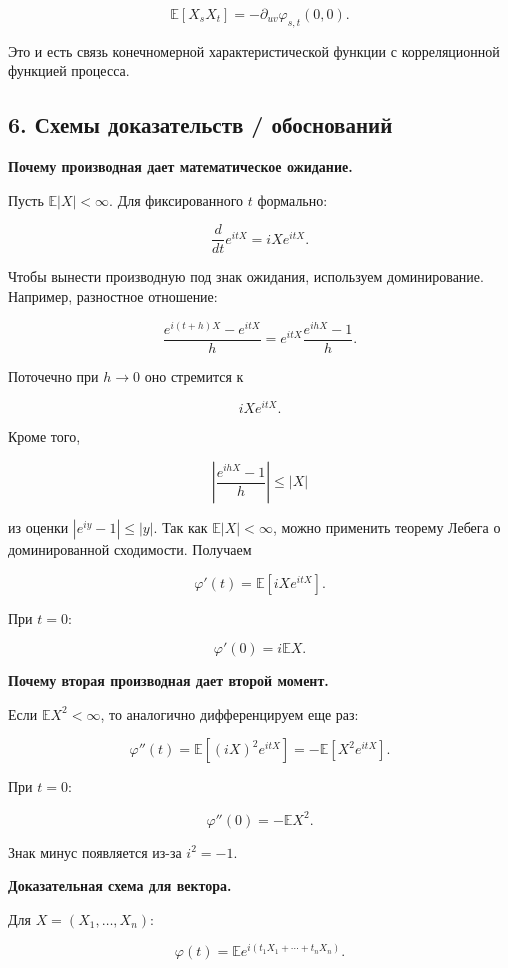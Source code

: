 \documentclass[
  11pt,
  a4paper,
]{article}
\begin{document}
\[
\mathbb E[X_sX_t]
=
-\partial_{uv}\varphi_{s,t}(0,0).
\]

Это и есть связь конечномерной характеристической функции с
корреляционной функцией процесса.

\subsection{6. Схемы доказательств /
обоснований}\label{ux441ux445ux435ux43cux44b-ux434ux43eux43aux430ux437ux430ux442ux435ux43bux44cux441ux442ux432-ux43eux431ux43eux441ux43dux43eux432ux430ux43dux438ux439}

\textbf{Почему производная дает математическое ожидание.}

Пусть \(\mathbb E|X|<\infty\). Для фиксированного \(t\) формально:

\[
\frac{d}{dt}e^{itX}=iXe^{itX}.
\]

Чтобы вынести производную под знак ожидания, используем доминирование.
Например, разностное отношение:

\[
\frac{e^{i(t+h)X}-e^{itX}}{h}
=
e^{itX}\frac{e^{ihX}-1}{h}.
\]

Поточечно при \(h\to0\) оно стремится к

\[
iXe^{itX}.
\]

Кроме того,

\[
\left|\frac{e^{ihX}-1}{h}\right|
\le |X|
\]

из оценки \(|e^{iy}-1|\le |y|\). Так как \(\mathbb E|X|<\infty\), можно
применить теорему Лебега о доминированной сходимости. Получаем

\[
\varphi'(t)=\mathbb E[iXe^{itX}].
\]

При \(t=0\):

\[
\varphi'(0)=i\mathbb EX.
\]

\textbf{Почему вторая производная дает второй момент.}

Если \(\mathbb EX^2<\infty\), то аналогично дифференцируем еще раз:

\[
\varphi''(t)
=
\mathbb E[(iX)^2e^{itX}]
=
-\mathbb E[X^2e^{itX}].
\]

При \(t=0\):

\[
\varphi''(0)=-\mathbb EX^2.
\]

Знак минус появляется из-за \(i^2=-1\).

\textbf{Доказательная схема для вектора.}

Для \(X=(X_1,\ldots,X_n)\):

\[
\varphi(t)=\mathbb E e^{i(t_1X_1+\cdots+t_nX_n)}.
\]
\end{document}
